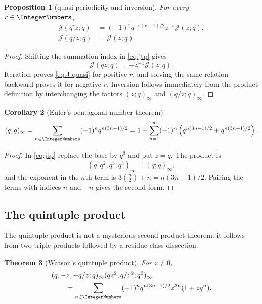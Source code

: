 \documentclass[11pt,oneside]{article}
\newtheorem{theorem}{Theorem}[section]
\newtheorem{proposition}[theorem]{Proposition}
\newtheorem{corollary}[theorem]{Corollary}
\theoremstyle{definition}
\newcommand{\J}{\mathcal J}
\begin{document}
\begin{proposition}[quasi-periodicity and inversion]\label{prop:J-quasi}
For every $r\in\IntegerNumbers$,
\begin{align}
 \J(q^rz;q)&=(-1)^rq^{-r(r-1)/2}z^{-r}\J(z;q),\label{eq:J-quasi}\\
 \J(q/z;q)&=\J(z;q).\label{eq:J-inversion}
\end{align}
\end{proposition}

\begin{proof}
Shifting the summation index in \eqref{eq:jtp} gives
\[
 \J(qz;q)=-z^{-1}\J(z;q).
\]
Iteration proves \eqref{eq:J-quasi} for positive $r$, and solving the same relation backward proves it for negative $r$. Inversion follows immediately from the product definition by interchanging the factors $(z;q)_\infty$ and $(q/z;q)_\infty$.
\end{proof}

\begin{corollary}[Euler's pentagonal number theorem]\label{cor:pentagonal}
\begin{equation}\label{eq:pentagonal}
 (q;q)_\infty
 =\sum_{n\in\IntegerNumbers}(-1)^nq^{n(3n-1)/2}
 =1+\sum_{n=1}^\infty(-1)^n
 \left(q^{n(3n-1)/2}+q^{n(3n+1)/2}\right).
\end{equation}
\end{corollary}

\begin{proof}
In \eqref{eq:jtp} replace the base by $q^3$ and put $z=q$. The product is
\[
 (q,q^2,q^3;q^3)_\infty=(q;q)_\infty,
\]
and the exponent in the $n$th term is
$3\binom n2+n=n(3n-1)/2$. Pairing the terms with indices $n$ and $-n$ gives the second form.
\end{proof}

\subsection{The quintuple product}

The quintuple product is not a mysterious second product theorem: it follows from two triple products followed by a residue-class dissection.

\begin{theorem}[Watson's quintuple product]\label{thm:qpi}
For $z\ne0$,
\begin{align}
 &(q,-z,-q/z;q)_\infty(qz^2,q/z^2;q^2)_\infty\notag\\
 &\qquad=\sum_{n\in\IntegerNumbers}(-1)^n
 q^{n(3n-1)/2}z^{3n}(1+zq^n).
\label{eq:qpi}
\end{align}
\end{theorem}
\end{document}
